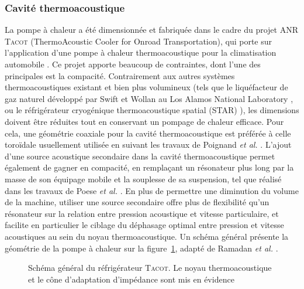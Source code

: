 \subsubsection{Cavité thermoacoustique}
La pompe à chaleur a été dimensionnée et fabriquée dans le cadre du projet ANR \textsc{Tacot} (ThermoAcoustic Cooler for Onroad Transportation), qui porte sur l'application d'une pompe à chaleur thermoacoustique pour la climatisation automobile \cite{ANR_thermo-acoustic_2019}. Ce projet apporte beaucoup de contraintes, dont l'une des principales est la compacité. Contrairement aux autres systèmes thermoacoustiques existant et bien plus volumineux (tels que le liquéfacteur de gaz naturel développé par Swift et Wollan au Los Alamos National Laboratory \cite{swift_thermoacoustics_2002, wollan_development_2002}, ou le réfrigérateur cryogénique thermoacoustique spatial (STAR) \cite{adeff_measurement_1991, garrett_thermoacoustic_1993}), les dimensions doivent être réduites tout en conservant un pompage de chaleur efficace. Pour cela, une géométrie coaxiale pour la cavité thermoacoustique est préférée à celle toroïdale usuellement utilisée en suivant les travaux de Poignand \textit{et al.} \cite{poignand_thermoacoustic_2011, poignand_analysis_2013}. L'ajout d'une source acoustique secondaire dans la cavité thermoacoustique permet également de gagner en compacité, en remplaçant un résonateur plus long par la masse de son équipage mobile et la souplesse de sa suspension, tel que réalisé dans les travaux de Poese \textit{et al.} \cite{poese_thermoacoustic_2004}. En plus de permettre une diminution du volume de la machine, utiliser une source secondaire offre plus de flexibilité qu'un résonateur sur la relation entre pression acoustique et vitesse particulaire, et facilite en particulier le ciblage du déphasage optimal entre pression et vitesse acoustiques au sein du noyau thermoacoustique. Un schéma général présente la géométrie de la pompe à chaleur sur la figure~\ref{fig:SchemaGeneralTACOT}, adapté de Ramadan \textit{et al.} \cite{ramadan_design_2021}. 

\begin{figure}[!ht]
    \centering
    
    \caption{Schéma général du réfrigérateur \textsc{Tacot}. Le noyau thermoacoustique et le cône d'adaptation d'impédance sont mis en évidence}
    \label{fig:SchemaGeneralTACOT}
\end{figure}

